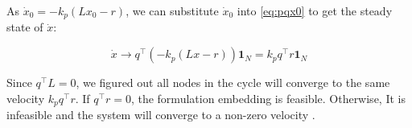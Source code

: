 \documentclass[letterpaper, 10 pt, conference]{ieeeconf}  %
\begin{document}
As \(\dot{x}_0 = -k_p(Lx_0 - r)\), we can substitute \(\dot{x}_0\) into \eqref{eq:pqx0} to get the steady state of \(\dot{x}\):

\begin{equation}\label{eq:steady}
    \dot{x} \rightarrow    q^\top (-k_p (Lx -r))\mathbf{1}_N
    = k_p q^\top r \mathbf{1}_N
\end{equation}

\noindent Since \(q^\top L = 0\), we figured out all nodes in the cycle will converge to the same velocity \(k_p q^\top r\). If \(q^\top r = 0\), the formulation embedding is feasible. Otherwise, It is infeasible and the system will converge to a non-zero velocity \cite{dimarogonas_connection_2008}. 








\end{document}

